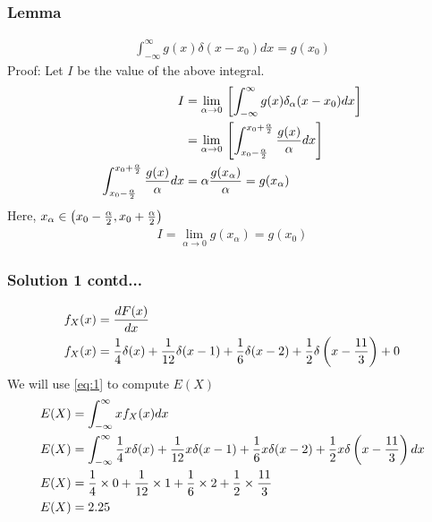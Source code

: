 \documentclass{beamer}
\begin{document}
\begin{frame}[fragile]
\frametitle{Lemma}
\begin{align}
    \int_{-\infty}^{\infty}g(x)\delta(x-x_0)dx = g(x_0) \label{eq:1}
\end{align}
Proof:\newline
Let $I$ be the value of the above integral.
\begin{align}
I &= \lim_{\alpha \to 0}{}\left[\int_{-\infty}^{\infty}g(x)\delta_{\alpha}(x-x_0)dx\right]\\
&= \lim_{\alpha \to 0}{}\left[\int_{x_0 - \frac{\alpha}{2}}^{x_0+\frac{\alpha}{2}}\frac{g(x)}{\alpha}dx\right]\\
\int_{x_0 - \frac{\alpha}{2}}^{x_0+\frac{\alpha}{2}}\frac{g(x)}{\alpha}dx &= \alpha\frac{g(x_{\alpha})}{\alpha} = g(x_\alpha)
\end{align}
Here, $x_{\alpha} \in \left(x_0 - \frac{\alpha}{2}, x_0 + \frac{\alpha}{2}\right)$
\begin{align}
I = \lim_{\alpha \to 0}g(x_{\alpha}) = g(x_0)
\end{align}
\end{frame}
\begin{frame}[fragile]
\frametitle{Solution 1 contd...}
\begin{align}
f_X(x) &= \frac{dF(x)}{dx}\\
f_{X}(x) &= \frac{1}{4}\delta(x) + \frac{1}{12}\delta(x - 1) + \frac{1}{6}\delta(x-2)+\frac{1}{2}\delta\left(x-\frac{11}{3}\right) + 0
\end{align}
We will use \eqref{eq:1} to compute $E(X)$
\begin{align}
    E(X) &= \int_{-\infty}^{\infty}xf_X(x)dx\\
    E(X) &= \int_{-\infty}^{\infty}\frac{1}{4}x\delta(x) + \frac{1}{12}x\delta(x - 1) + \frac{1}{6}x\delta(x-2) + \frac{1}{2}x\delta\left(x-\frac{11}{3}\right)dx\\
    E(X) &= {\frac{1}{4}}\times 0 + {\frac{1}{12}}\times 1 + {\frac{1}{6}}\times 2 + {\frac{1}{2}}\times{\frac{11}{3}}\\
    E(X) &= 2.25
\end{align}
\end{frame}
\end{document}
